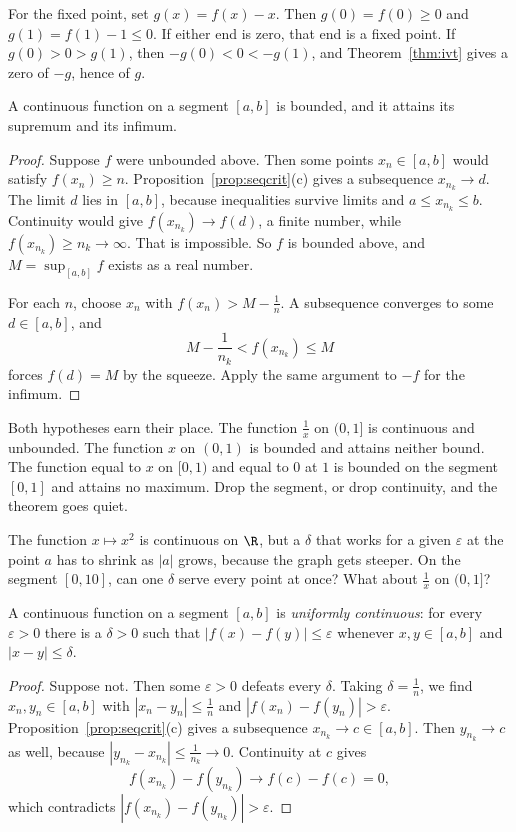 For the fixed point, set $g(x)=f(x)-x$. Then $g(0)=f(0)\ge0$ and $g(1)=f(1)-1\le0$. If either end is zero, that end is a fixed point. If $g(0)>0>g(1)$, then $-g(0)<0<-g(1)$, and Theorem~\ref{thm:ivt} gives a zero of $-g$, hence of $g$.

\begin{theorem}\label{thm:evt}
A continuous function on a segment $[a,b]$ is bounded, and it attains its supremum and its infimum.
\end{theorem}
\begin{proof}
Suppose $f$ were unbounded above. Then some points $x_n\in[a,b]$ would satisfy $f(x_n)\ge n$. Proposition~\ref{prop:seqcrit}(c) gives a subsequence $x_{n_k}\to d$. The limit $d$ lies in $[a,b]$, because inequalities survive limits and $a\le x_{n_k}\le b$. Continuity would give $f(x_{n_k})\to f(d)$, a finite number, while $f(x_{n_k})\ge n_k\to\infty$. That is impossible. So $f$ is bounded above, and $M=\sup_{[a,b]}f$ exists as a real number.

For each $n$, choose $x_n$ with $f(x_n)>M-\frac1n$. A subsequence converges to some $d\in[a,b]$, and
\[
M-\frac1{n_k}<f(x_{n_k})\le M
\]
forces $f(d)=M$ by the squeeze. Apply the same argument to $-f$ for the infimum.
\end{proof}

Both hypotheses earn their place. The function $\frac1x$ on $(0,1]$ is continuous and unbounded. The function $x$ on $(0,1)$ is bounded and attains neither bound. The function equal to $x$ on $[0,1)$ and equal to $0$ at $1$ is bounded on the segment $[0,1]$ and attains no maximum. Drop the segment, or drop continuity, and the theorem goes quiet.

\begin{think}
The function $x\mapsto x^2$ is continuous on $\R$, but a $\delta$ that works for a given $\varepsilon$ at the point $a$ has to shrink as $|a|$ grows, because the graph gets steeper. On the segment $[0,10]$, can one $\delta$ serve every point at once? What about $\frac1x$ on $(0,1]$?
\end{think}

\begin{theorem}\label{thm:heine}
A continuous function on a segment $[a,b]$ is \emph{uniformly continuous}: for every $\varepsilon>0$ there is a $\delta>0$ such that $|f(x)-f(y)|\le\varepsilon$ whenever $x,y\in[a,b]$ and $|x-y|\le\delta$.
\end{theorem}
\begin{proof}
Suppose not. Then some $\varepsilon>0$ defeats every $\delta$. Taking $\delta=\frac1n$, we find $x_n,y_n\in[a,b]$ with $|x_n-y_n|\le\frac1n$ and $|f(x_n)-f(y_n)|>\varepsilon$. Proposition~\ref{prop:seqcrit}(c) gives a subsequence $x_{n_k}\to c\in[a,b]$. Then $y_{n_k}\to c$ as well, because $|y_{n_k}-x_{n_k}|\le\frac1{n_k}\to0$. Continuity at $c$ gives
\[
f(x_{n_k})-f(y_{n_k})\to f(c)-f(c)=0,
\]
which contradicts $|f(x_{n_k})-f(y_{n_k})|>\varepsilon$.
\end{proof}

